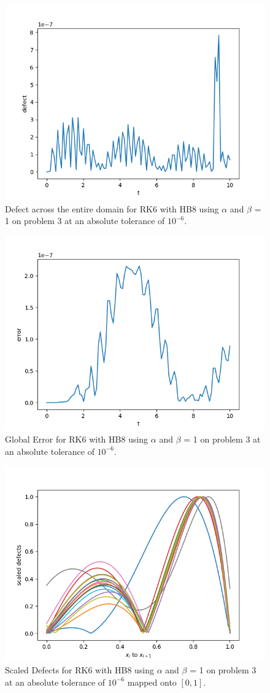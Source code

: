 \begin{figure}[H]
\centering
\includegraphics[width=0.7\linewidth]{./figures/static_alpha_rk4_with_hb6_p3_global_defect}
\caption{Defect across the entire domain for RK6 with HB8 using $\alpha$ and $\beta$ = 1 on problem 3 at an absolute tolerance of $10^{-6}$.}
\label{fig:static_alpha_rk6_with_hb8_p3_global_defect}
\end{figure}

\begin{figure}[H]
\centering
\includegraphics[width=0.7\linewidth]{./figures/static_alpha_rk6_with_hb8_p3_global_error}
\caption{Global Error for RK6 with HB8 using $\alpha$ and $\beta$ = 1 on problem 3 at an absolute tolerance of $10^{-6}$.}
\label{fig:static_alpha_rk6_with_hb8_p3_global_error}
\end{figure}

\begin{figure}[H]
\centering
\includegraphics[width=0.7\linewidth]{./figures/static_alpha_rk6_with_hb8_p3_scaled_defects}
\caption{Scaled Defects for RK6 with HB8 using $\alpha$ and $\beta$ = 1 on problem 3 at an absolute tolerance of $10^{-6}$ mapped onto $[0, 1]$.}
\label{fig:static_alpha_rk6_with_hb8_p3_scaled_defects}
\end{figure}

